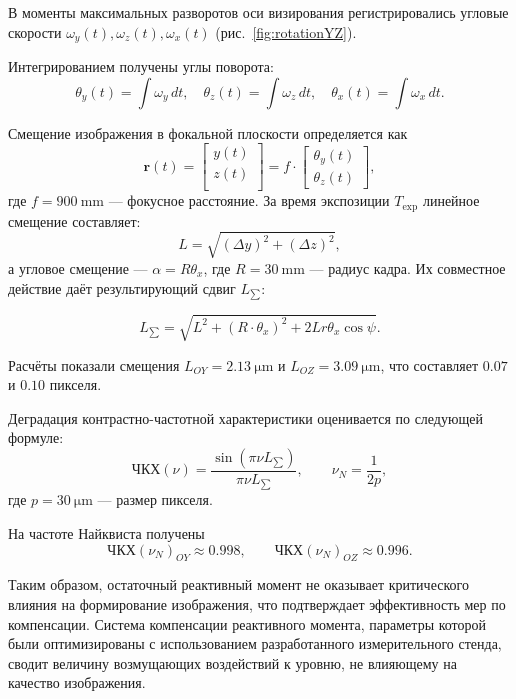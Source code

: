 В моменты максимальных разворотов оси визирования регистрировались угловые скорости
$\omega_y(t), \omega_z(t), \omega_x(t)$ (рис.~\cref{fig:rotationYZ}).

Интегрированием получены углы поворота:
\begin{equation*}
	\theta_y(t)=\int \omega_y\,dt,\quad
	\theta_z(t)=\int \omega_z\,dt,\quad
	\theta_x(t)=\int \omega_x\,dt.
\end{equation*}

Смещение изображения в фокальной плоскости определяется как
\begin{equation*}
	\label{eq:bias}
	\mathbf{r}(t) = 
	\begin{bmatrix}
		y(t) \\
		z(t) \\
	\end{bmatrix}
	= f \cdot
	\begin{bmatrix}
		\theta_{y}(t) \\
		\theta_{z}(t)
	\end{bmatrix},
\end{equation*}
где $f=\SI{900}{\milli\meter}$ — фокусное расстояние.
За время экспозиции $T_{\mathrm{exp}}$ линейное смещение составляет:
 \begin{equation*}
	\label{eq:biasL}
	L=\sqrt{(\Delta y)^2+(\Delta z)^2},
\end{equation*}
а угловое смещение — $\alpha=R\theta_x$, где $R=\SI{30}{\milli\meter}$ — радиус кадра.
Их совместное действие даёт результирующий сдвиг $L_{\sum}$:

 \begin{equation*}
	\label{eq:L_total}
	L_{\sum} = \sqrt{L^2 + (R\cdot \theta_x)^2 + 2Lr\theta_x\cos{\psi}}.
\end{equation*}

Расчёты показали смещения
$L_{OY}=\SI{2.13}{\micro\meter}$ и
$L_{OZ}=\SI{3.09}{\micro\meter}$,
что составляет $0.07$ и $0.10$ пикселя.

Деградация контрастно-частотной характеристики оценивается по следующей формуле:
\begin{equation*}
	\text{ЧКХ}(\nu)=\frac{\sin(\pi\nu L_{\mathrm{\sum}})}{\pi\nu L_{\mathrm{\sum}}},\qquad
	\nu_N=\frac{1}{2p},
\end{equation*}
где $p=\SI{30}{\micro\meter}$ — размер пикселя.

 На частоте Найквиста получены
\[
ЧКХ(\nu_N)_{OY}\approx 0.998,\qquad
ЧКХ(\nu_N)_{OZ}\approx 0.996.
\]

Таким образом, остаточный реактивный момент не оказывает критического
влияния на формирование изображения, что подтверждает эффективность
мер по компенсации. Система компенсации реактивного момента,
параметры которой были оптимизированы с использованием разработанного
измерительного стенда, сводит величину возмущающих воздействий к
уровню, не влияющему на качество изображения.


